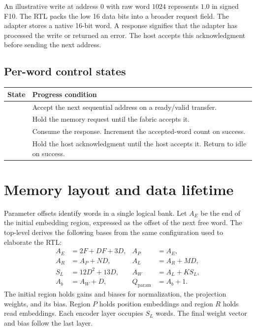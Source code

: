 An illustrative write at address \(0\) with raw word \(1024\) represents \(1.0\) in signed F10. The RTL packs the low 16 data bits into a broader request field. The adapter stores a native 16-bit word. A response signifies that the adapter has processed the write or returned an error. The host accepts this acknowledgment before sending the next address.

\subsection{Per-word control states}
{\smalltbl
\begin{tabularx}{\linewidth}{@{}P{30mm}Y@{}}
\toprule
State & Progress condition\\ \midrule
{} & Accept the next sequential address on a ready/valid transfer.\\
 & Hold the memory request until the fabric accepts it.\\
 & Consume the response. Increment the accepted-word count on success.\\
 & Hold the host acknowledgment until the host accepts it. Return to idle on success.\\
\bottomrule
\end{tabularx}}

\clearpage

\section{Memory layout and data lifetime}
Parameter offsets identify words in a single logical bank. Let \(A_E\) be the end of the initial embedding region, expressed as the offset of the next free word. The top-level derives the following bases from the same configuration used to elaborate the RTL:
\begin{align}
A_E &= 2F+DF+3D, & A_P&=A_E,\\
A_R &= A_P+ND, & A_L&=A_R+MD,\\
S_L &= 12D^2+13D, & A_W&=A_L+KS_L,\\
A_b &= A_W+D, & Q_{\mathrm{param}}&=A_b+1.
\end{align}
The initial region holds gains and biases for normalization, the projection weights, and its bias. Region \(P\) holds position embeddings and region \(R\) holds read embeddings. Each encoder layer occupies \(S_L\) words. The final weight vector and bias follow the last layer.

